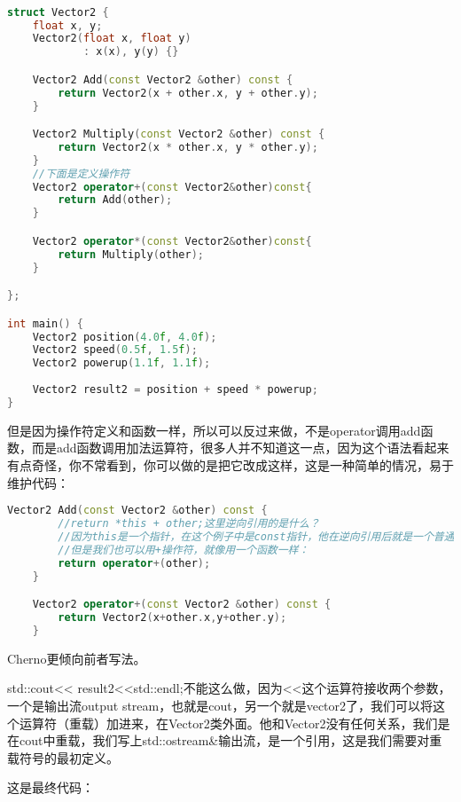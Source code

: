 \begin{lstlisting}[language=c++]

struct Vector2 {
    float x, y;
    Vector2(float x, float y)
            : x(x), y(y) {}

    Vector2 Add(const Vector2 &other) const {
        return Vector2(x + other.x, y + other.y);
    }

    Vector2 Multiply(const Vector2 &other) const {
        return Vector2(x * other.x, y * other.y);
    }
    //下面是定义操作符
    Vector2 operator+(const Vector2&other)const{
        return Add(other);
    }

    Vector2 operator*(const Vector2&other)const{
        return Multiply(other);
    }

};

int main() {
    Vector2 position(4.0f, 4.0f);
    Vector2 speed(0.5f, 1.5f);
    Vector2 powerup(1.1f, 1.1f);
    
    Vector2 result2 = position + speed * powerup;
}
\end{lstlisting}

但是因为操作符定义和函数一样，所以可以反过来做，不是{\ncodestyle operator}调用{\ncodestyle add}函数，而是{\ncodestyle add}函数调用加法运算符，很多人并不知道这一点，因为这个语法看起来有点奇怪，你不常看到，你可以做的是把它改成这样，这是一种简单的情况，易于维护代码：

\begin{lstlisting}[language=c++]
    Vector2 Add(const Vector2 &other) const {
        //return *this + other;这里逆向引用的是什么？
        //因为this是一个指针，在这个例子中是const指针，他在逆向引用后就是一个普通的vector2对象，然后与other相加，这是大多数人的书写方式
        //但是我们也可以用+操作符，就像用一个函数一样：
        return operator+(other);
    }

    Vector2 operator+(const Vector2 &other) const {
        return Vector2(x+other.x,y+other.y);
    }
\end{lstlisting}

Cherno更倾向前者写法。

{\ncodestyle std::cout<< result2<<std::endl;}不能这么做，因为{\ncodestyle <<}这个运算符接收两个参数，一个是输出流output stream，也就是cout，另一个就是vector2了，我们可以将这个运算符（重载）加进来，在Vector2类外面。他和Vector2没有任何关系，我们是在cout中重载，我们写上{\ncodestyle std::ostream\&}输出流，是一个引用，这是我们需要对重载符号的最初定义。

这是最终代码：

